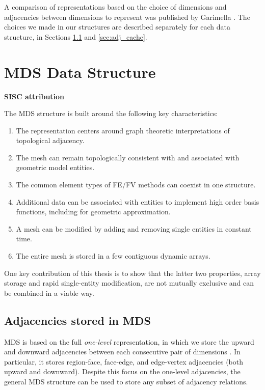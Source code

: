 A comparison of representations based on the choice
of dimensions and adjacencies between
dimensions to represent
was published by Garimella \cite{garimella2002mesh}.
The choices we made in our structures are described separately
for each data structure,
in Sections \ref{sec:mds_adj} and \ref{sec:adj_cache}.

\section{MDS Data Structure}
\label{sec:sisc}

{\bf SISC attribution}

The MDS structure is built around the following key characteristics:

\begin{enumerate}
\item The representation centers around graph theoretic interpretations
of topological adjacency.
\item The mesh can remain topologically consistent with and associated with
geometric model entities.
\item The common element types of FE/FV methods can coexist in one structure.
\item Additional data can be associated with entities to implement
high order basis functions, including for geometric approximation.
\item A mesh can be modified by adding and removing single entities in constant time.
\item The entire mesh is stored in a few contiguous dynamic arrays.
\end{enumerate}

One key contribution of this thesis is to show that the latter two properties,
array storage and rapid single-entity modification, are not mutually exclusive
and can be combined in a viable way.

\subsection{Adjacencies stored in MDS}
\label{sec:mds_adj}

MDS is based on the full {\it one-level} representation,
in which we store the upward
and downward adjacencies between each consecutive
pair of dimensions \cite{beall1997general}.
In particular, it stores
region-face, face-edge, and edge-vertex adjacencies
(both upward and downward).
Despite this focus on the one-level adjacencies, the general MDS
structure can be used to store any subset of
adjacency relations.

